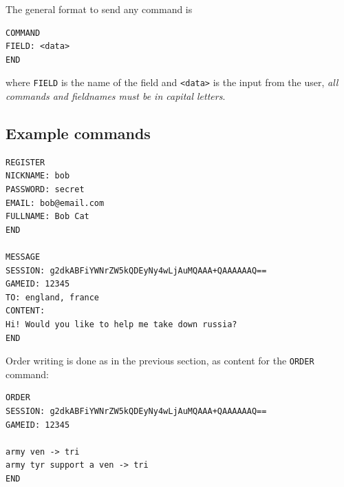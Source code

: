 \documentclass[11pt,a4paper]{report}
\begin{document}
The general format to send any command is
\begin{verbatim}
COMMAND
FIELD: <data>
END
\end{verbatim}

where \verb|FIELD| is the name of the field and \verb|<data>| is the
input from the user, \emph{all commands and fieldnames must be in capital
letters}.


\subsection*{Example commands}
\label{sec:examplecmd}
\begin{verbatim}
REGISTER
NICKNAME: bob
PASSWORD: secret
EMAIL: bob@email.com
FULLNAME: Bob Cat
END

MESSAGE
SESSION: g2dkABFiYWNrZW5kQDEyNy4wLjAuMQAAA+QAAAAAAQ==
GAMEID: 12345
TO: england, france
CONTENT:
Hi! Would you like to help me take down russia?
END
\end{verbatim}

Order writing is done as in the previous section, as content for the
\verb|ORDER| command:
\begin{verbatim}
ORDER
SESSION: g2dkABFiYWNrZW5kQDEyNy4wLjAuMQAAA+QAAAAAAQ==
GAMEID: 12345

army ven -> tri
army tyr support a ven -> tri
END
\end{verbatim}

\renewcommand\bibname{References}


\end{document}
